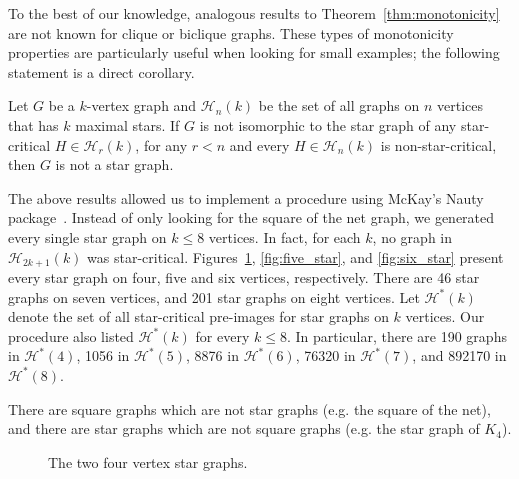 To the best of our knowledge, analogous results to Theorem~\ref{thm:monotonicity} are not known for clique or biclique graphs.
These types of monotonicity properties are particularly useful when looking for small examples; the following statement is a direct corollary.

\begin{corollary}
    Let $G$ be a $k$-vertex graph and $\mathcal{H}_n(k)$ be the set of all graphs on $n$ vertices that has $k$ maximal stars.
    If $G$ is not isomorphic to the star graph of any star-critical $H \in \mathcal{H}_r(k)$, for any $r < n$ and every $H \in \mathcal{H}_n(k)$ is non-star-critical, then $G$ is not a star graph.
\end{corollary}

The above results allowed us to implement a procedure using McKay's Nauty package~\cite{nauty}.
Instead of only looking for the square of the net graph, we generated every single star graph on $k \leq 8$ vertices.
In fact, for each $k$, no graph in $\mathcal{H}_{2k+1}(k)$ was star-critical.
Figures~\ref{fig:four_star}, \ref{fig:five_star}, and \ref{fig:six_star} present every star graph on four, five and six vertices, respectively.
There are 46 star graphs on seven vertices, and 201 star graphs on eight vertices.
Let $\mathcal{H}^*(k)$ denote the set of all star-critical pre-images for star graphs on $k$ vertices.
Our procedure also listed $\mathcal{H}^*(k)$ for every $k \leq 8$.
In particular, there are 190 graphs in $\mathcal{H}^*(4)$, 1056 in $\mathcal{H}^*(5)$, 8876 in $\mathcal{H}^*(6)$, 76320 in $\mathcal{H}^*(7)$, and 892170 in $\mathcal{H}^*(8)$.

\begin{corollary}
	There are square graphs which are not star graphs (e.g. the square of the net), and there are star graphs which are not square graphs (e.g. the star graph of $K_4$).
\end{corollary}

\begin{figure}
    \centering
    \begin{subfigure}{.5\textwidth}
      \centering
      
    \end{subfigure}%
    \begin{subfigure}{.5\textwidth}
      \centering
      
    \end{subfigure}
    \caption{The two four vertex star graphs. \label{fig:four_star}}
\end{figure}


